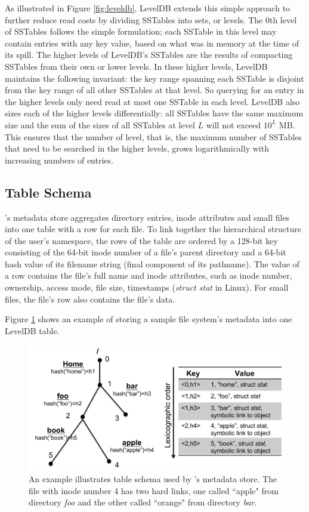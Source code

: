 As illustrated in Figure \ref{fig:leveldb}, LevelDB extends this simple approach to further reduce read costs by dividing SSTables into sets, or levels.
The 0th level of SSTables follows the simple formulation; each SSTable in this level may contain entries with any key value, based on what was in memory at the time of its spill.
The higher levels of LevelDB's SSTables are the results of compacting SSTables from their own or lower levels.
In these higher levels, LevelDB maintains the following invariant: the key range spanning each SSTable is disjoint from the key range of all other SSTables at that level.
So querying for an entry in the higher levels only need read at most one SSTable in each level.
LevelDB also sizes each of the higher levels differentially:  all SSTables have the same maximum size and the sum of the sizes of all SSTables at level $L$ will not exceed $10^L$ MB.
This ensures that the number of level, that is, the maximum number of SSTables that need to be searched in the higher levels, grows logarithmically with increasing numbers of entries.

\subsection{Table Schema}
\giga's metadata store aggregates directory entries, 
inode attributes and small files into one \ldb table with a row for each file.
To link together the hierarchical structure of the user's namespace,
the rows of the table are ordered by a 128-bit key consisting of 
the 64-bit inode number of a file's parent directory 
and a 64-bit hash value of its filename string (final component of its pathname).
The value of a row contains the file's full name and inode attributes,
such as inode number, ownership, access mode, file size, timestamps (\textit{struct stat} in Linux).
For small files, the file's row also contains the file's data.

Figure \ref{fig:schema} shows an example of storing a sample file system's metadata into one LevelDB table.
\begin{figure}[!ht]
\centering
\includegraphics[scale=0.35]{figs/schema}
\caption{An example illustrates table schema used by \tfs's metadata store.
         The file with inode number 4 has two hard links,
         one called ``apple" from directory \textit{foo} and 
         the other called ``orange" from directory \textit{bar}.}
\label{fig:schema}
\end{figure}

